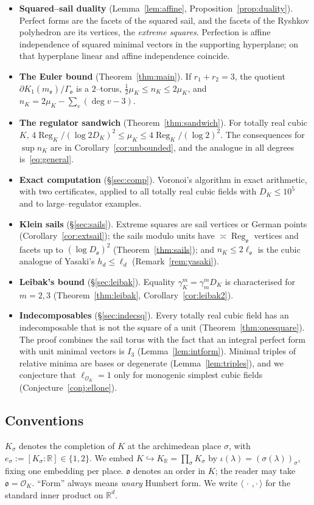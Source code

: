 \documentclass[11pt,reqno]{amsart}
\theoremstyle{plain}
\theoremstyle{definition}
\newcommand{\R}{\mathbb{R}}
\newcommand{\Reg}{\operatorname{Reg}}
\newcommand{\Ok}{\mathfrak{o}}
\newcommand{\bdy}{\partial}
\newcommand{\nK}{n_K}
\newcommand{\muK}{\mu_K}
\begin{document}
\begin{itemize}[leftmargin=1.4em]
\item \textbf{Squared--sail duality} (Lemma~\ref{lem:affine}, Proposition~\ref{prop:duality}). Perfect
forms are the facets of the squared sail, and the facets of the Ryshkov polyhedron are its vertices, the
\emph{extreme squares}. Perfection is affine independence of squared minimal vectors in the supporting
hyperplane; on that hyperplane linear and affine independence coincide.
\item \textbf{The Euler bound} (Theorem~\ref{thm:main}). If $r_1+r_2=3$, the quotient
$\bdy K_1(m_\Ok)/\Gamma_\Ok$ is a $2$--torus, $\tfrac12\muK\le\nK\le2\muK$, and $\nK=2\muK-\sum_v(\deg v-3)$.
\item \textbf{The regulator sandwich} (Theorem~\ref{thm:sandwich}). For totally real cubic $K$,
$4\Reg_K/(\log2D_K)^2\le\muK\le4\Reg_K/(\log2)^2$. The consequences for $\sup\nK$ are in
Corollary~\ref{cor:unbounded}, and the analogue in all degrees is~\eqref{eq:general}.
\item \textbf{Exact computation} (\S\ref{sec:comp}). Voronoi's algorithm in exact arithmetic, with two
certificates, applied to all totally real cubic fields with $D_K\le10^5$ and to large--regulator examples.
\item \textbf{Klein sails} (\S\ref{sec:sails}). Extreme squares are sail vertices or German points
(Corollary~\ref{cor:extsail}); the sails modulo units have $\asymp\Reg_\Ok$ vertices and facets up to
$(\log D_\Ok)^2$ (Theorem~\ref{thm:sails}); and $\nK\le2\ell_\Ok$ is the cubic analogue of Yasaki's
$h_d\le\ell_d$ (Remark~\ref{rem:yasaki}).
\item \textbf{Leibak's bound} (\S\ref{sec:leibak}). Equality $\gamma_K^m=\gamma_m^mD_K$ is characterised for
$m=2,3$ (Theorem~\ref{thm:leibak}, Corollary~\ref{cor:leibak2}).
\item \textbf{Indecomposables} (\S\ref{sec:indecsq}). Every totally real cubic field has an indecomposable
that is not the square of a unit (Theorem~\ref{thm:onesquare}). The proof combines the sail torus with the
fact that an integral perfect form with unit minimal vectors is $I_3$ (Lemma~\ref{lem:intform}). Minimal triples
of relative minima are bases or degenerate (Lemma~\ref{lem:triples}), and we conjecture that
$\ell_{\mathcal O_K}=1$ only for monogenic simplest cubic fields (Conjecture~\ref{conj:ellone}).
\end{itemize}

\subsection*{Conventions}
$K_\sigma$ denotes the completion of $K$ at the archimedean place $\sigma$, with
$e_\sigma:=[K_\sigma:\R]\in\{1,2\}$. We embed $K\hookrightarrow K_\R=\prod_\sigma K_\sigma$ by
$\iota(\lambda)=(\sigma(\lambda))_\sigma$, fixing one embedding per place. $\Ok$ denotes an order in $K$;
the reader may take $\Ok=\mathcal O_K$. ``Form'' always means \emph{unary} Humbert form. We write
$\langle\,\cdot\,,\cdot\,\rangle$ for the standard inner product on $\R^d$.
\end{document}
